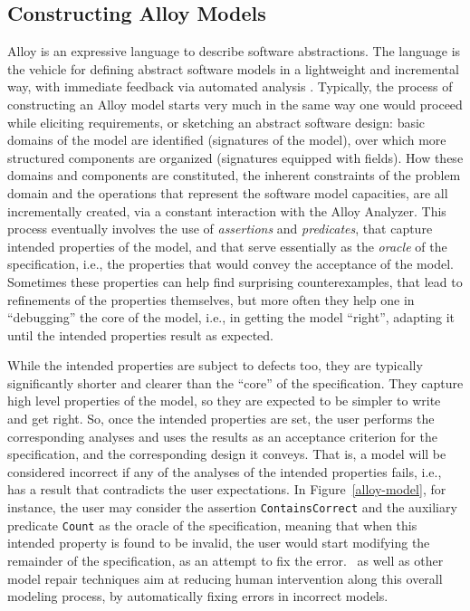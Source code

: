 \subsection{Constructing Alloy Models}

Alloy is an expressive language to describe software abstractions. The language is the vehicle for defining abstract software models in a lightweight and incremental way, with immediate feedback via automated analysis \cite{Jackson2006}. Typically, the process of constructing an Alloy model starts very much in the same way one would proceed while eliciting requirements, or sketching an abstract software design: basic domains of the model are identified (signatures of the model), over which more structured components are organized (signatures equipped with fields). How these domains and components are constituted, the inherent constraints of the problem domain and the operations that represent the software model capacities, are all incrementally created, via a constant interaction with the Alloy Analyzer. This process eventually involves the use of \emph{assertions} and \emph{predicates}, that capture intended properties of the model, and that serve essentially as the \emph{oracle} of the specification, i.e., the properties that would convey the acceptance of the model. Sometimes these properties can help find surprising counterexamples, that lead to refinements of the properties themselves, but more often they help one in ``debugging'' the core of the model, i.e., in getting the model ``right'', adapting it until the intended properties result as expected. 

While the intended properties are subject to defects too, they are typically significantly shorter and clearer than the ``core'' of the specification. They capture high level properties of the model, so they are expected to be simpler to write and get right. So, once the intended properties are set, the user performs the corresponding analyses and uses the results as an acceptance criterion for the specification, and the corresponding design it conveys. That is, a model will be considered incorrect if any of the analyses of the intended properties fails, i.e., has a result that contradicts the user expectations. In Figure~\ref{alloy-model}, for instance, the user may consider the assertion \texttt{ContainsCorrect} and the auxiliary predicate \texttt{Count} as the oracle of the specification, meaning that when this intended property is found to be invalid, the user would start modifying the remainder of the specification, as an attempt to fix the error. \technique\ as well as other model repair techniques aim at reducing human intervention along this overall modeling process, by automatically fixing errors in incorrect models.

